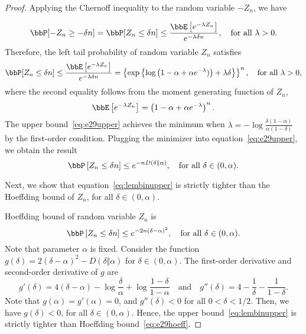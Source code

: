 \documentclass[11pt]{article}
\newcommand{\of}[1]{\left(#1\right)}
\newcommand{\off}[1]{\left[#1\right]}
\newcommand{\offf}[1]{\left\{#1\right\}}
\theoremstyle{plain}
\theoremstyle{definition}
\begin{document}
\begin{proof}
    Applying the Chernoff inequality to the random variable $-Z_n$, we have
    
    \begin{equation}
    	\bbP[-Z_n \geq -\delta n] =  \bbP[Z_n \leq \delta n]  \leq  \frac{\bbE\off{e^{-\lambda Z_n}}}{e^{-\lambda \delta n}}, \quad \text{for all } \lambda >0.
    \end{equation}
    Therefore, the left tail probability of random variable $Z_n$ satisfies
    \begin{equation}\label{eq:e29upper}
    	\bbP[Z_n \leq \delta n] \leq \frac{\bbE\off{e^{-\lambda Z_n}}}{e^{-\lambda \delta n}} = \offf {\exp \offf{\log \of{1 - \alpha + \alpha e^{-\lambda})}+ \lambda \delta }}^n,\quad \text{for all } \lambda >0,
    \end{equation}
    where the second equality follows from the moment generating function of $Z_n$,
    \[\bbE\off{e^{-\lambda Z_n}} = \of{1 - \alpha + \alpha e^{-\lambda}}^n. \]
    The upper bound~\eqref{eq:e29upper} achieves the minimum when $\lambda = -\log {\frac{\delta(1-\alpha)}{\alpha(1 - \delta)}}$ by the first-order condition. Plugging the minimizer into equation~\eqref{eq:e29upper}, we obtain the result
    \[ \bbP\off{Z_n \leq \delta n}  \leq e^{-n D\of{\delta \Vert \alpha}}, \quad \text{for all }\delta \in (0,\alpha).  \]
    
    \vspace{0.2cm}
    Next, we show that equation~\eqref{eq:lembinupper} is strictly tighter than the Hoeffding bound of $Z_n$, for all $\delta \in (0,\alpha)$.
    
    \vspace{0.2cm}
    Hoeffding bound of random variable $Z_n$ is 
    \begin{equation}\label{eq:e29hoeff}
    	\bbP\off{Z_n \leq \delta n} \leq e^{ {-2n(\delta - \alpha)^2}}, \quad \text{for all }\delta \in (0,\alpha).
    \end{equation}
    Note that parameter $\alpha$ is fixed. Consider the function $g(\delta) = 2(\delta - \alpha)^2 - D\of{\delta \Vert \alpha}$ for $\delta \in (0,\alpha)$. The first-order derivative and  second-order derivative of $g$ are
    \[ g'(\delta) = 4(\delta - \alpha) - \log \frac{\delta}{\alpha} + \log \frac{1-\delta}{1-\alpha} \quad \text{and} \quad g''(\delta) = 4 - \frac{1}{\delta} - \frac{1}{1-\delta}. \] 
    Note that $ g(\alpha) = g'(\alpha) = 0$, and $g''(\delta) < 0$ for all $0 < \delta < 1/2$. Then, we have $g(\delta) < 0$, for all $\delta \in (0,\alpha)$. Hence, the upper bound~\eqref{eq:lembinupper} is strictly tighter than Hoeffding bound~\eqref{eq:e29hoeff}.
    
\end{proof}
\end{document}
